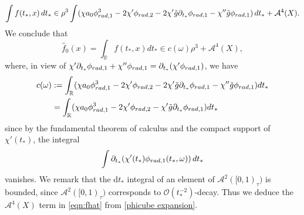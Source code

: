 \documentclass[10pt,a4paper,reqno]{amsart}
\newcommand{\RR}{\mathbb{R}}
\newcommand{\A}{\mathcal{A}}
\newcommand{\pa}{\partial}
\newcommand{\ti}{\tilde}
\theoremstyle{definition}
\theoremstyle{remark}
\numberwithin{equation}{section}
\newcommand{\xo}{\omega}
\newcommand{\cA}{\mathcal A}
\newcommand{\ts}{t_*}
\newcommand{\wh}{\widehat}
\newcommand{\pats}{\pa_{t_*}}
\begin{document}
 \begin{equation*}
        \int f(\ts,x) \,d\ts \in  \rho^3 \int (\chi a_0 \phi^3_{ {\rm rad},1} -2\chi' \phi_{{\rm rad},2}
        - 2\chi' \ti g \pats \phi_{{\rm rad},1} - \chi''\ti g \phi_{{\rm rad},1}) \,d\ts + \A^4(X) .
\end{equation*} 
We conclude that
\begin{equation}
\label{eqn:fhat}
    \wh{f}_0(x) = \int_\RR f(\ts,x) d\ts \in c(\omega)\rho^3 + \A^4(X),
\end{equation}
where, in view of $\chi' \pa_{\ts}\phi_{\rm{rad},1} + \chi'' \phi_{\rm{rad},1} = \pa_{\ts} (\chi' \phi_{\rm{rad},1})$, we have 
\begin{equation}
\label{eqn:c(omega)}
\begin{split}
	c(\omega) &:= \int_\RR (\chi a_0 \phi_{\rm rad,1}^3 - 2\chi' \phi_{\rm{rad},2} - 2\chi' \ti{g} \pa_{\ts}\phi_{\rm{rad},1} - \chi'' \ti{g}\phi_{\rm{rad},1}) d\ts \\
	&=  \int_\RR (\chi a_0 \phi_{\rm rad,1}^3 - 2\chi' \phi_{\rm{rad},2} - \chi' \ti{g} \pa_{\ts}\phi_{\rm{rad},1}) d\ts
\end{split}
\end{equation}since by the fundamental theorem of calculus and the compact support of $\chi'(\ts)$, the integral $$\int \pats(\chi'(\ts) \phi_{{\rm rad},1}(\ts,\xo)) \,d\ts$$ vanishes. We remark that the d$t_*$ integral of an element of $\cA^2([0,1)_\tau)$ is bounded, since $\A^2([0,1)_\tau)$ corresponds to $\mathcal{O}(\ts^{-2})$-decay. Thus we deduce the $\A^4(X)$ term in \eqref{eqn:fhat} from \eqref{phicube expansion}. 
\end{document}
